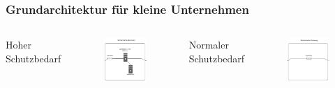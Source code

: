\documentclass[hyperref={pdfpagelabels=false},xcolor=dvipsnames]{beamer}
\begin{document}
\begin{frame}

	\frametitle{Grundarchitektur für kleine Unternehmen}
	\begin{columns}
		\centering Hoher Schutzbedarf
				\begin{figure}
				\includegraphics[width=.8\textwidth]	{arch.001.jpeg}
			\end{figure}
	
		\centering Normaler Schutzbedarf
		\begin{figure}
			\includegraphics[width=.8\textwidth]	{arch.002.jpeg}
		\end{figure}
	\end{columns}	
\end{frame}
\end{document}
